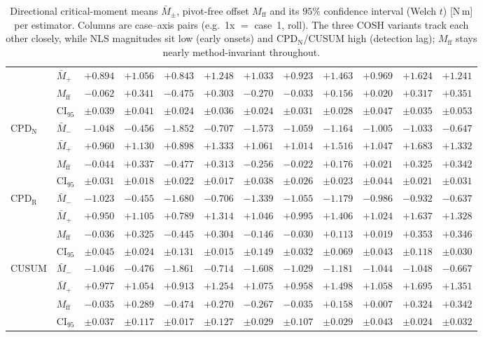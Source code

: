 \documentclass[10pt]{article}
\begin{document}
\begin{table}[t]
\begin{tabular}{ll rrrrrrrrrr}
 & $\bar M_+$ & $+0.894$ & $+1.056$ & $+0.843$ & $+1.248$ & $+1.033$ & $+0.923$ & $+1.463$ & $+0.969$ & $+1.624$ & $+1.241$ \\
 & $M_{\mathrm{ff}}$ & $-0.062$ & $+0.341$ & $-0.475$ & $+0.303$ & $-0.270$ & $-0.033$ & $+0.156$ & $+0.020$ & $+0.317$ & $+0.351$ \\
 & CI$_{95}$ & $\pm0.039$ & $\pm0.041$ & $\pm0.024$ & $\pm0.036$ & $\pm0.024$ & $\pm0.031$ & $\pm0.028$ & $\pm0.047$ & $\pm0.035$ & $\pm0.053$ \\
\midrule
CPD$_{\mathrm{N}}$ & $\bar M_-$ & $-1.048$ & $-0.456$ & $-1.852$ & $-0.707$ & $-1.573$ & $-1.059$ & $-1.164$ & $-1.005$ & $-1.033$ & $-0.647$ \\
 & $\bar M_+$ & $+0.960$ & $+1.130$ & $+0.898$ & $+1.333$ & $+1.061$ & $+1.014$ & $+1.516$ & $+1.047$ & $+1.683$ & $+1.332$ \\
 & $M_{\mathrm{ff}}$ & $-0.044$ & $+0.337$ & $-0.477$ & $+0.313$ & $-0.256$ & $-0.022$ & $+0.176$ & $+0.021$ & $+0.325$ & $+0.342$ \\
 & CI$_{95}$ & $\pm0.031$ & $\pm0.018$ & $\pm0.022$ & $\pm0.017$ & $\pm0.038$ & $\pm0.026$ & $\pm0.023$ & $\pm0.044$ & $\pm0.021$ & $\pm0.031$ \\
\midrule
CPD$_{\mathrm{R}}$ & $\bar M_-$ & $-1.023$ & $-0.455$ & $-1.680$ & $-0.706$ & $-1.339$ & $-1.055$ & $-1.179$ & $-0.986$ & $-0.932$ & $-0.637$ \\
 & $\bar M_+$ & $+0.950$ & $+1.105$ & $+0.789$ & $+1.314$ & $+1.046$ & $+0.995$ & $+1.406$ & $+1.024$ & $+1.637$ & $+1.328$ \\
 & $M_{\mathrm{ff}}$ & $-0.036$ & $+0.325$ & $-0.445$ & $+0.304$ & $-0.146$ & $-0.030$ & $+0.113$ & $+0.019$ & $+0.353$ & $+0.346$ \\
 & CI$_{95}$ & $\pm0.045$ & $\pm0.024$ & $\pm0.131$ & $\pm0.015$ & $\pm0.149$ & $\pm0.032$ & $\pm0.069$ & $\pm0.043$ & $\pm0.118$ & $\pm0.030$ \\
\midrule
CUSUM & $\bar M_-$ & $-1.046$ & $-0.476$ & $-1.861$ & $-0.714$ & $-1.608$ & $-1.029$ & $-1.181$ & $-1.044$ & $-1.048$ & $-0.667$ \\
 & $\bar M_+$ & $+0.977$ & $+1.054$ & $+0.913$ & $+1.254$ & $+1.075$ & $+0.958$ & $+1.498$ & $+1.058$ & $+1.695$ & $+1.351$ \\
 & $M_{\mathrm{ff}}$ & $-0.035$ & $+0.289$ & $-0.474$ & $+0.270$ & $-0.267$ & $-0.035$ & $+0.158$ & $+0.007$ & $+0.324$ & $+0.342$ \\
 & CI$_{95}$ & $\pm0.037$ & $\pm0.117$ & $\pm0.017$ & $\pm0.127$ & $\pm0.029$ & $\pm0.107$ & $\pm0.029$ & $\pm0.043$ & $\pm0.024$ & $\pm0.032$ \\
\bottomrule
\end{tabular}
\caption{Directional critical-moment means $\bar M_{\pm}$, pivot-free
offset $M_{\mathrm{ff}}$ and its $95\%$ confidence interval (Welch $t$)
[N\,m] per estimator. Columns are case--axis pairs (e.g.\ 1x $=$ case~1,
roll). The three COSH variants track each other closely, while NLS
magnitudes sit low (early onsets) and CPD$_{\mathrm{N}}$/CUSUM high
(detection lag); $M_{\mathrm{ff}}$ stays nearly method-invariant
throughout.}
\label{tab:nls-mom}
\end{table}
\end{document}
